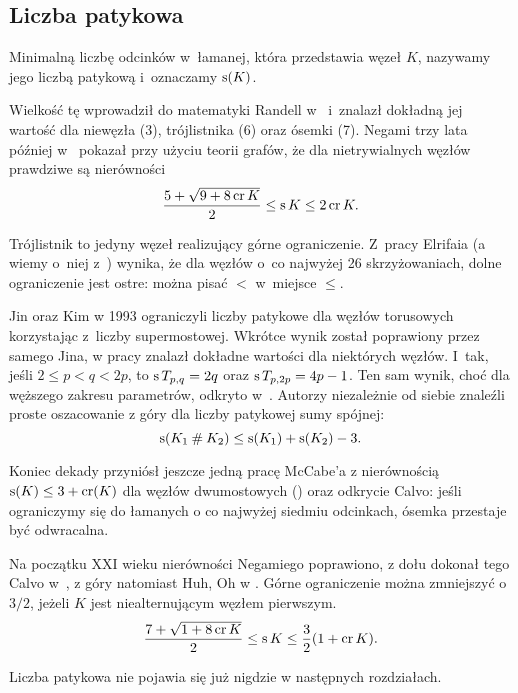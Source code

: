 
\subsection{Liczba patykowa}


\begin{definition}
    Minimalną liczbę odcinków w~łamanej, która przedstawia węzeł $K$, nazywamy jego liczbą patykową i~oznaczamy $\operatorname{s}(K)$.
\end{definition}

Wielkość tę wprowadził do matematyki Randell w~\cite{randell98} i~znalazł dokładną jej wartość dla niewęzła (3), trójlistnika (6) oraz ósemki (7).
Negami trzy lata później w~\cite{negami91} pokazał przy użyciu teorii grafów, że dla nietrywialnych węzłów prawdziwe są nierówności
\begin{equation}
    \frac{5+\sqrt{9 + 8 \operatorname{cr} K}}{2} \le \operatorname{s} K \le 2 \operatorname{cr} K.
\end{equation}

Trójlistnik to jedyny węzeł realizujący górne ograniczenie.
Z~pracy Elrifaia \cite{elrifai06} (a wiemy o~niej z~\cite[s. 1]{huh11}) wynika, że dla węzłów o~co najwyżej 26 skrzyżowaniach, dolne ograniczenie jest ostre: można pisać $<$ w~miejsce $\le$.

Jin oraz Kim w 1993 ograniczyli liczby patykowe dla węzłów torusowych korzystając z~liczby supermostowej.
Wkrótce wynik został poprawiony przez samego Jina, w pracy \cite{jin97} znalazł dokładne wartości dla niektórych węzłów.
I~tak, jeśli $2 \le p < q < 2p$, to $\operatorname{s} T_{p,q} = 2q$ oraz $\operatorname{s} T_{p, 2p} = 4p-1$.
Ten sam wynik, choć dla węższego zakresu parametrów, odkryto w~\cite{greilsheimer97}.
%
Autorzy niezależnie od siebie znaleźli proste oszacowanie z góry dla liczby patykowej sumy spójnej:
\begin{equation}
    \operatorname{s}(K_1 \mathbin{\#} K_2) \le \operatorname{s}(K_1) + \operatorname{s}(K_2) - 3.
\end{equation}

Koniec dekady przyniósł jeszcze jedną pracę McCabe'a z nierównością $\operatorname{s}(K) \le 3 + \operatorname{cr} (K)$ dla węzłów dwumostowych (\cite{mccabe98}) oraz odkrycie Calvo: jeśli ograniczymy się do łamanych o co najwyżej siedmiu odcinkach, ósemka przestaje być odwracalna.

Na początku XXI wieku nierówności Negamiego poprawiono, z dołu dokonał tego Calvo w~\cite{calvo01}, z góry natomiast Huh, Oh w \cite{huh11}.
Górne ograniczenie można zmniejszyć o $3/2$, jeżeli $K$ jest niealternującym węzłem pierwszym.
\begin{equation}
    \frac{7+\sqrt{1 + 8 \operatorname{cr} K}}{2} \le \operatorname{s} K \le \frac{3}{2} (1 + \operatorname{cr} K).
\end{equation}

Liczba patykowa nie pojawia się już nigdzie w następnych rozdziałach.



